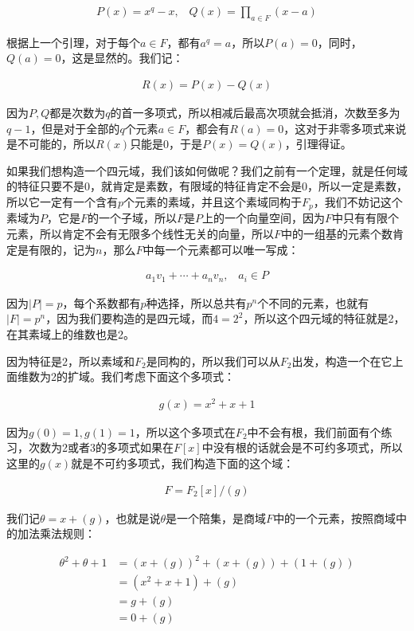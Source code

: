 \documentclass[12pt, a4paper, oneside]{ctexart}
\theoremstyle{definition}
\begin{document}
\begin{align*}
P(x)=x^q-x,\;\;\; Q(x)=\prod_{a\in F}(x-a)
\end{align*}

根据上一个引理，对于每个$a\in F$，都有$a^q=a$，所以$P(a)=0$，同时，$Q(a)=0$，这是显然的。我们记：

\begin{align*}
R(x)=P(x)-Q(x)
\end{align*}

因为$P,Q$都是次数为$q$的首一多项式，所以相减后最高次项就会抵消，次数至多为$q-1$，但是对于全部的$q$个元素$a\in F$，都会有$R(a)=0$，这对于非零多项式来说是不可能的，所以$R(x)$只能是0，于是$P(x)=Q(x)$，引理得证。

如果我们想构造一个四元域，我们该如何做呢？我们之前有一个定理，就是任何域的特征只要不是0，就肯定是素数，有限域的特征肯定不会是0，所以一定是素数，所以它一定有一个含有$p$个元素的素域，并且这个素域同构于$F_p$，我们不妨记这个素域为$P$，它是$F$的一个子域，所以$F$是$P$上的一个向量空间，因为$F$中只有有限个元素，所以肯定不会有无限多个线性无关的向量，所以$F$中的一组基的元素个数肯定是有限的，记为$n$，那么$F$中每一个元素都可以唯一写成：

\begin{align*}
a_1v_1+\cdots+a_nv_n,\;\;\; a_i\in P
\end{align*}

因为$|P|=p$，每个系数都有$p$种选择，所以总共有$p^n$个不同的元素，也就有$|F|=p^n$，因为我们要构造的是四元域，而$4=2^2$，所以这个四元域的特征就是2，在其素域上的维数也是2。

因为特征是2，所以素域和$F_2$是同构的，所以我们可以从$F_2$出发，构造一个在它上面维数为2的扩域。我们考虑下面这个多项式：

\begin{align*}
g(x)=x^2+x+1
\end{align*}

因为$g(0)=1,g(1)=1$，所以这个多项式在$F_2$中不会有根，我们前面有个练习，次数为2或者3的多项式如果在$F[x]$中没有根的话就会是不可约多项式，所以这里的$g(x)$就是不可约多项式，我们构造下面的这个域：

\begin{align*}
F=F_2[x]/(g)
\end{align*}

我们记$\theta=x+(g)$，也就是说$\theta$是一个陪集，是商域$F$中的一个元素，按照商域中的加法乘法规则：

\begin{align*}
\theta^2+\theta+1&=(x+(g))^2+(x+(g))+(1+(g))\\
&=(x^2+x+1)+(g)\\
&=g+(g)\\
&=0+(g)
\end{align*}
\end{document}
